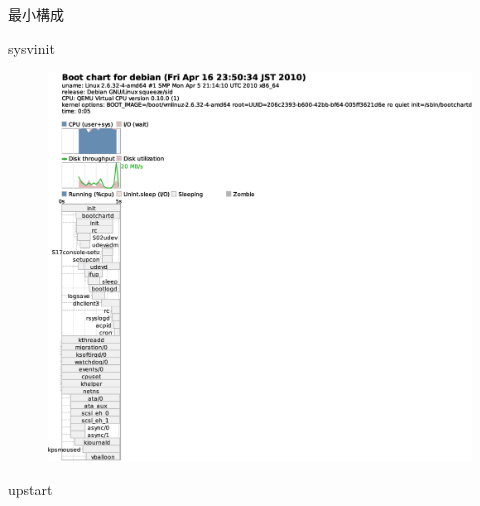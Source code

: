 \begin{frame}{最小構成}
\begin{minipage}[t]{0.48\hsize}
sysvinit
\begin{figure}[h]
\begin{center}
\includegraphics[width=1.0\hsize]{image201004/upstart/sysvinit-bootchart.eps}
\end{center}
\end{figure}
\end{minipage}
\begin{minipage}[t]{0.48\hsize}
upstart
\begin{figure}[h]
\begin{center}

\end{center}
\end{figure}
\end{minipage}
\end{frame}
